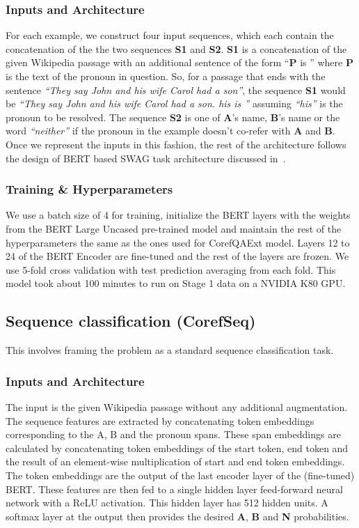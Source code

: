 \documentclass[11pt,a4paper]{article}
\begin{document}
\subsubsection{Inputs and Architecture}
For each example, we construct four input sequences, which each contain the concatenation of the the two sequences \textbf{S1} and \textbf{S2}. \textbf{S1} is a concatenation of the given Wikipedia passage with an additional sentence of the form ``\textbf{P} is '' where \textbf{P} is the text of the pronoun in question. So, for a passage that ends with the sentence \textit{``They say John and his wife Carol had a son''}, the sequence \textbf{S1} would be \textit{``They say John and his wife Carol had a son. his is ''} assuming \textit{``his''} is the pronoun to be resolved. The sequence \textbf{S2} is one of \textbf{A}'s name, \textbf{B}'s name or the word \textit{``neither''} if the pronoun in the example doesn't co-refer with \textbf{A} and \textbf{B}. Once we represent the inputs in this fashion, the rest of the architecture follows the design of BERT based SWAG task architecture discussed in~\cite{devlin2018bert}.

\subsubsection{Training \& Hyperparameters}
We use a batch size of 4 for training, initialize the BERT layers with the weights from the BERT Large Uncased pre-trained model and maintain the rest of the hyperparameters the same as the ones used for CorefQAExt model. Layers 12 to 24 of the BERT Encoder are fine-tuned and the rest of the layers are frozen. We use 5-fold cross validation with test prediction averaging from each fold. This model took about 100 minutes to run on Stage 1 data on a NVIDIA K80 GPU.

\subsection{Sequence classification (CorefSeq)}

This involves framing the problem as a standard sequence classification task. 

\subsubsection{Inputs and Architecture}

The input is the given Wikipedia passage without any additional augmentation. The sequence features are extracted by concatenating token embeddings corresponding to the A, B and the pronoun spans. These span embeddings are calculated by concatenating token embeddings of the start token, end token and the result of an element-wise multiplication of start and end token embeddings. The token embeddings are the output of the last encoder layer of the (fine-tuned) BERT. These features are then fed to a single hidden layer feed-forward neural network with a ReLU activation. This hidden layer has 512 hidden units. A softmax layer at the output then provides the desired \textbf{A}, \textbf{B} and \textbf{N} probabilities.
\end{document}
